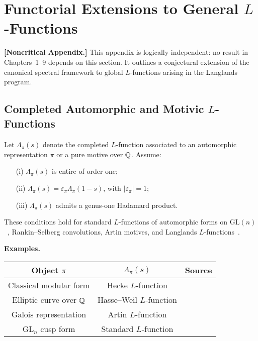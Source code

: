 \section{Functorial Extensions to General \texorpdfstring{$L$}{L}-Functions}
\label{app:functorial_extensions}

\noindent\textbf{[Noncritical Appendix.]}  
This appendix is logically independent: no result in Chapters~1–9 depends on this section. It outlines a conjectural extension of the canonical spectral framework to global \( L \)-functions arising in the Langlands program.

\subsection*{Completed Automorphic and Motivic \texorpdfstring{$L$}{L}-Functions}

Let \( \Lambda_\pi(s) \) denote the completed \( L \)-function associated to an automorphic representation \( \pi \) or a pure motive over \( \mathbb{Q} \). Assume:
\begin{itemize}
  \item[(i)] \( \Lambda_\pi(s) \) is entire of order one;
  \item[(ii)] \( \Lambda_\pi(s) = \varepsilon_\pi \Lambda_\pi(1 - s) \), with \( |\varepsilon_\pi| = 1 \);
  \item[(iii)] \( \Lambda_\pi(s) \) admits a genus-one Hadamard product.
\end{itemize}

These conditions hold for standard \( L \)-functions of automorphic forms on \( \mathrm{GL}(n) \)~\cite{Cogdell2007Lectures}, Rankin–Selberg convolutions, Artin motives, and Langlands \( L \)-functions~\cite{Langlands1970EulerProducts,Deligne1971WeilI}.

\medskip
\noindent\textbf{Examples.}
\begin{center}
\renewcommand{\arraystretch}{1.3}
\begin{tabular}{|c|c|c|}
\hline
\textbf{Object \( \pi \)} & \textbf{\( \Lambda_\pi(s) \)} & \textbf{Source} \\
\hline
Classical modular form & Hecke \( L \)-function & \cite{Cogdell2007Lectures} \\
Elliptic curve over \( \mathbb{Q} \) & Hasse–Weil \( L \)-function & \cite{Deligne1971WeilI} \\
Galois representation & Artin \( L \)-function & \cite{Langlands1970EulerProducts} \\
\( \mathrm{GL}_n \) cusp form & Standard \( L \)-function & \cite{Cogdell2007Lectures} \\
\hline
\end{tabular}
\end{center}

